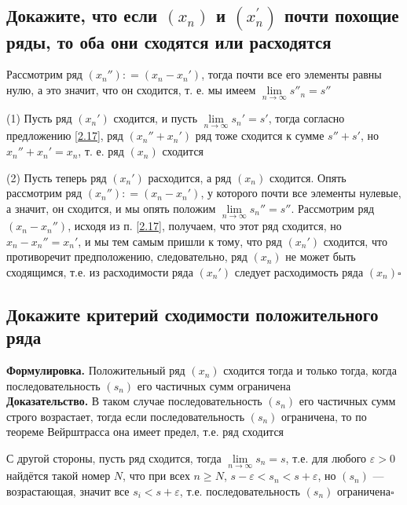 \documentclass[a4paper]{article}
\newcommand{\qed}{\hfill$\square$}
\begin{document}
\subsection{Докажите, что если $\left(x_{n}\right)$ и $\left(x_{n}^{\prime}\right)$ почти похощие ряды, то оба они сходятся или расходятся}
Рассмотрим ряд $(x_n''): = (x_n - x_n')$, тогда почти все его элементы равны нулю, а это значит, что он сходится, т. е. мы имеем $ \lim\limits_{n \to \infty} s''_n = s''$
\label{2.18}

(1) Пусть ряд $(x_n')$ сходится, и пусть $\lim\limits_{n \to \infty}s_n' =s'$, тогда согласно предложению \ref{2.17}, ряд $(x_n'' + x_n')$ ряд тоже сходится к сумме $s''+s'$, но $x_n''+x_n' = x_n$, т. е. ряд $(x_n)$ сходится

(2) Пусть теперь ряд $(x_n')$ расходится, а ряд $(x_n)$ сходится. Опять рассмотрим ряд $(x_n''): = (x_n - x_n')$, у которого почти все элементы нулевые, а значит, он сходится, и мы опять положим $\lim\limits_{n \to \infty}s_n'' = s''.$ Рассмотрим ряд $(x_n - x_n'')$, исходя из п. \ref{2.17}, получаем, что этот ряд сходится, но $x_n - x_n'' = x_n'$, и мы тем самым пришли к тому, что ряд $(x_n')$ сходится, что противоречит предположению, следовательно, ряд $(x_n)$ не может быть сходящимся, т.е. из расходимости ряда $(x_n')$ следует расходимость ряда $(x_n)$\qed

\subsection{Докажите критерий сходимости положительного ряда}
\label{2.19}
\textbf{Формулировка.} Положительный ряд $(x_n)$ сходится тогда и только тогда, когда последовательность $(s_n)$ его частичных сумм ограничена\\[2mm]
\indent\textbf{Доказательство.} В таком случае последовательность $(s_n)$ его частичных сумм строго возрастает, тогда если последовательность $(s_n)$ ограничена, то по теореме Вейрштрасса она имеет предел, т.е. ряд сходится

С другой стороны, пусть ряд сходится, тогда $\lim\limits_{n\to \infty} s_n =s$, т.е. для любого $\varepsilon >0$ найдётся такой номер $N$, что при всех $n \ge N$, $s-\varepsilon < s_n < s+ \varepsilon$, но $(s_n)$ — возрастающая, значит все $s_i < s + \varepsilon$, т.е. последовательность $(s_n)$ ограничена\qed
\end{document}
